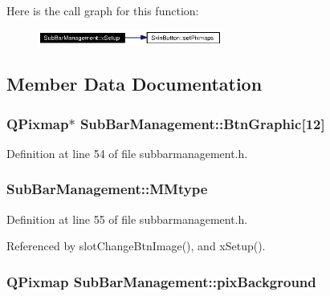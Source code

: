 Here is the call graph for this function:\begin{figure}[H]
\begin{center}
\leavevmode
\includegraphics[width=171pt]{classSubBarManagement_SubBarManagementa2_cgraph}
\end{center}
\end{figure}


\subsection{Member Data Documentation}
\subsubsection{\setlength{\rightskip}{0pt plus 5cm}QPixmap$\ast$ {\bf Sub\-Bar\-Management::Btn\-Graphic}[12]\hspace{0.3cm}{\tt  [private]}}\label{classSubBarManagement_SubBarManagementr1}




Definition at line 54 of file subbarmanagement.h.
\subsubsection{ {\bf Sub\-Bar\-Management::MMtype}\hspace{0.3cm}{\tt  [private]}}\label{classSubBarManagement_SubBarManagementr2}




Definition at line 55 of file subbarmanagement.h.

Referenced by slot\-Change\-Btn\-Image(), and x\-Setup().
\subsubsection{\setlength{\rightskip}{0pt plus 5cm}QPixmap {\bf Sub\-Bar\-Management::pix\-Background}\hspace{0.3cm}{\tt  [private]}}\label{classSubBarManagement_SubBarManagementr0}




